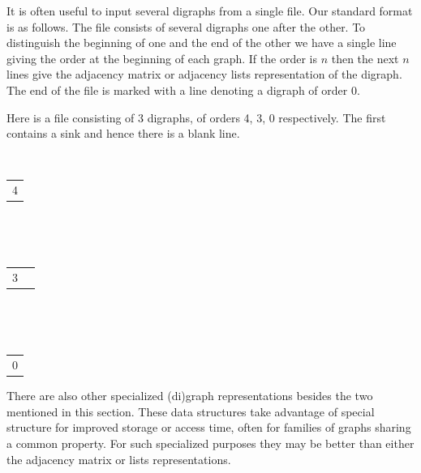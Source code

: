 It is often useful to input several digraphs from a single file. Our
standard format is as follows. The file consists of several digraphs 
one after the other. To distinguish the beginning of one and the end of
the other we have a single line giving the order at the beginning of
each graph. If the order is $n$ then the next $n$ lines give the
adjacency matrix or adjacency lists representation of the digraph. 
The end of the file is marked with a line denoting a digraph of order
$0$.

\begin{Example}
Here is a file consisting of 3 digraphs, of orders 4, 3, 0 respectively. 
The first contains a sink and hence there is a blank line.

\begin{center}
\begin{minipage}{1in}
~~~\begin{tabular}{l}
4 \\
\end{tabular}\\

~~~\begin{tabular}{ll}
3 \\
\end{tabular}\\

~~~\begin{tabular}{l}
0 \\
\end{tabular}
\end{minipage}
\end{center}
\end{Example}


There are also other specialized (di)graph representations besides the
two mentioned in this section.  These data structures take advantage of
special structure for improved storage or access time, often for
families of graphs sharing a common property. For such specialized
purposes they may be better than either the adjacency matrix or lists
representations.

